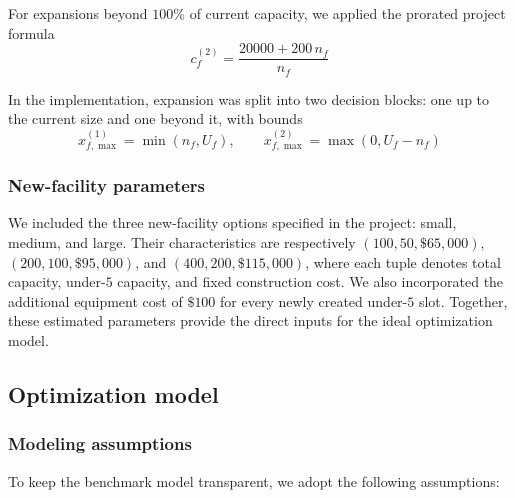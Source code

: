 \documentclass[11pt]{article}
\newcommand{\1}{\mathbb{I}}
\begin{document}
For expansions beyond \(100\%\) of current capacity, we applied the prorated project formula
\[
c_f^{(2)} = \frac{20000 + 200\,n_f}{n_f}
\]

In the implementation, expansion was split into two decision blocks: one up to the current size and one beyond it, with bounds
\[
x^{(1)}_{f,\max} = \min(n_f, U_f),
\qquad
x^{(2)}_{f,\max} = \max(0, U_f - n_f)
\]

\subsubsection{New-facility parameters}

We included the three new-facility options specified in the project: small, medium, and large. Their characteristics are respectively \((100,50,\$65{,}000)\), \((200,100,\$95{,}000)\), and \((400,200,\$115{,}000)\), where each tuple denotes total capacity, under-\(5\) capacity, and fixed construction cost. We also incorporated the additional equipment cost of \(\$100\) for every newly created under-\(5\) slot. Together, these estimated parameters provide the direct inputs for the ideal optimization model. 

\subsection{Optimization model}

\subsubsection{Modeling assumptions}

To keep the benchmark model transparent, we adopt the following assumptions:
\end{document}
